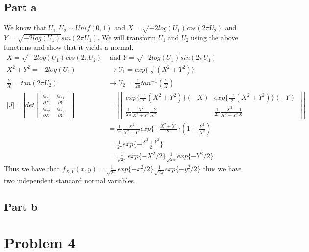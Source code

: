 \documentclass{article}\usepackage[]{graphicx}\usepackage[]{color}
\begin{document}
\subsection*{Part a}
We know that $U_1, U_2 \sim Unif(0,1)$ and $X = \sqrt{-2log(U_1)}cos(2\pi U_2)$ and $Y = \sqrt{-2log(U_1)}sin(2\pi U_1)$.  We will transform $U_1$ and $U_2$ using the above functions and show that it yields a normal.\\
\begin{align*}
X = \sqrt{-2log(U_1)}cos(2\pi U_2) &\text{ and } Y = \sqrt{-2log(U_1)}sin(2\pi U_1) \\
X^2 + Y^2 = -2log(U_1) &\longrightarrow U_1 = exp\{\frac{-1}{2} (X^2 + Y^2) \} \\
\frac{Y}{X} = tan(2\pi U_2) &\longrightarrow U_2 = \frac{1}{2\pi} tan^{-1}(\frac{Y}{X}) \\
|J| = |det \begin{bmatrix}\frac{\partial U_1}{\partial X} & \frac{\partial U_1}{\partial Y} \\ 
                          \frac{\partial U_2}{\partial X} & \frac{\partial U_2}{\partial Y} \end{bmatrix}|
   &= |\begin{bmatrix} exp\{ \frac{-1}{2}(X^2 + Y^2) \} (-X) & exp\{ \frac{-1}{2}(X^2 + Y^2) \} (-Y) \\ 
                       \frac{1}{2\pi} \frac{X^2}{X^2 + Y^2} \frac{-Y}{X^2} & 
                       \frac{1}{2\pi} \frac{X^2}{X^2 + Y^2} \frac{1}{X}\end{bmatrix}| \\
                      &= \frac{1}{2\pi} \frac{X^2}{X^2 + Y^2} exp\{-\frac{X^2 + Y^2}{2} \} (1 + \frac{Y^2}{X^2}) \\
   &= \frac{1}{2\pi} exp\{-\frac{X^2 + Y^2}{2} \} \\
   &= \frac{1}{\sqrt{2\pi}}exp\{-X^2 /2 \} \frac{1}{\sqrt{2\pi}}exp\{-Y^2 / 2 \} 
\end{align*}
Thus we have that $f_{X,Y}(x,y) = \frac{1}{\sqrt{2\pi}}exp\{-x^2 /2 \} \frac{1}{\sqrt{2\pi}}exp\{-y^2 / 2 \}$ thus we have two independent standard normal variables.

\subsection*{Part b}

\section*{Problem 4}
\end{document}
